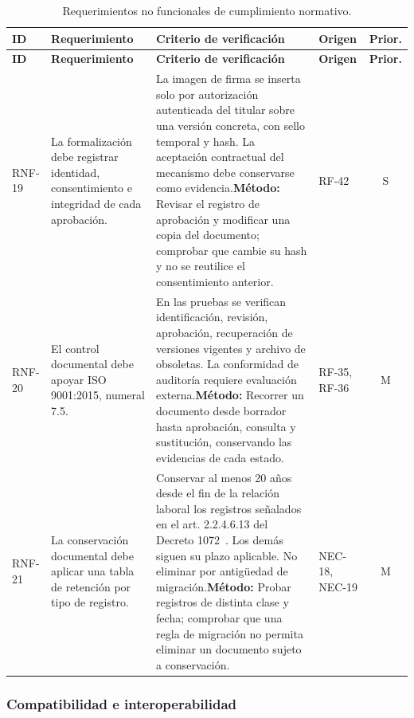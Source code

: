 \documentclass[12pt,letterpaper]{article}
\begin{document}
{\small
\begin{longtable}{@{}L{1.8cm} L{4.65cm} L{4.75cm} L{2.1cm} c@{}}
\caption{Requerimientos no funcionales de cumplimiento normativo.}\\
\toprule{}
\textbf{ID} & \textbf{Requerimiento} & \textbf{Criterio de verificación} & \textbf{Origen} & \textbf{Prior.} \\
\midrule
\endfirsthead
\toprule{}
\textbf{ID} & \textbf{Requerimiento} & \textbf{Criterio de verificación} & \textbf{Origen} & \textbf{Prior.} \\
\midrule
\endhead
\bottomrule
\endfoot
RNF-19 & La formalización debe registrar identidad, consentimiento e integridad de cada aprobación. & La imagen de firma se inserta solo por autorización autenticada del titular sobre una versión concreta, con sello temporal y hash. La aceptación contractual del mecanismo debe conservarse como evidencia.\newline \textbf{Método:} Revisar el registro de aprobación y modificar una copia del documento; comprobar que cambie su hash y no se reutilice el consentimiento anterior. & RF-42 & S \\
RNF-20 & El control documental debe apoyar ISO 9001:2015, numeral 7.5. & En las pruebas se verifican identificación, revisión, aprobación, recuperación de versiones vigentes y archivo de obsoletas. La conformidad de auditoría requiere evaluación externa.\newline \textbf{Método:} Recorrer un documento desde borrador hasta aprobación, consulta y sustitución, conservando las evidencias de cada estado. & RF-35, RF-36 & M \\
RNF-21 & La conservación documental debe aplicar una tabla de retención por tipo de registro. & Conservar al menos 20 años desde el fin de la relación laboral los registros señalados en el art. 2.2.4.6.13 del Decreto 1072~\cite{decreto1072}. Los demás siguen su plazo aplicable. No eliminar por antigüedad de migración.\newline \textbf{Método:} Probar registros de distinta clase y fecha; comprobar que una regla de migración no permita eliminar un documento sujeto a conservación. & NEC-18, NEC-19 & M \\
\end{longtable}
}

\subsubsection{Compatibilidad e interoperabilidad}
\end{document}
